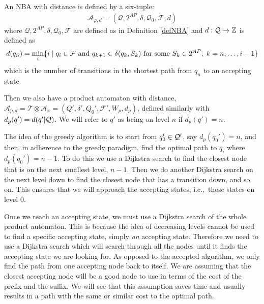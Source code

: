 \begin{definition}
\label{defBWD}
An NBA with distance is defined by a six-tuple:
\begin{align*}
\mathcal{A}_{\varphi,d} = (\mathcal{Q},2^{AP},\delta,\mathcal{Q}_0,\mathcal{F},d)
\end{align*}
where $\mathcal{Q},2^{AP},\delta,\mathcal{Q}_0,\mathcal{F}$ are defined as in Definition \ref{defNBA} and $d:\mathcal{Q} \rightarrow \mathbb{Z}$ is defined as 
\begin{align*}
d(q_n) = \min_i \{ i \hspace{0.1cm}|\hspace{0.1cm} q_i \in \mathcal{F} \text{ and } q_{k+1} \in \delta(q_{k},S_{k}) \text{ for some } S_k \in 2^{AP},\hspace{0.1cm} k = n,\dots, i-1 \}
\end{align*}
which is the number of transitions in the shortest path from $q_n$ to an accepting state.
\end{definition}

Then we also have a product automaton with distance, $\mathcal{A}_{p,d} = \mathcal{T} \otimes \mathcal{A}_\varphi = (Q', \delta', Q_0', \mathcal{F}', W_p, d_p)$, defined similarly with $d_p(q') = d(q'|\mathcal{Q})$. We will refer to $q'$ as being on level $n$ if $d_p(q') = n$.

The idea of the greedy algorithm is to start from $q_0' \in \mathcal{Q}'$, say $d_p(q_0')=n$, and then, in adherence to the greedy paradigm, find the optimal path to $q_i$ where $d_p(q_0')=n-1$. To do this we use a Dijkstra search to find the closest node that is on the next smallest level, $n-1$. Then we do another Dijkstra search on the next level down to find the closest node that has a transition down, and so on. This ensures that we will approach the accepting states, i.e.,\ those states on level 0. 

Once we reach an accepting state, we must use a Dijkstra search of the whole product automaton. This is because the idea of decreasing levels cannot be used to find a specific accepting state, simply \textit{an} accepting state. Therefore we need to use a Dijkstra search which will search through all the nodes until it finds the accepting state we are looking for. As opposed to the accepted algorithm, we only find the path from one accepting node back to itself. We are assuming that the closest accepting node will be a good node to use in terms of the cost of the prefix and the suffix. We will see that this assumption saves time and usually results in a path with the same or similar cost to the optimal path. 

